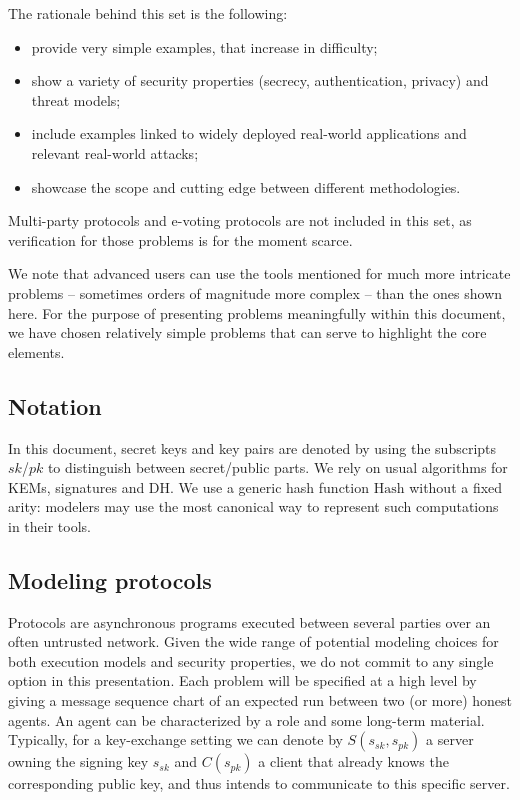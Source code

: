 \documentclass[11pt]{article}
\newcommand{\sfsk}{\mathit{sk}}
\newcommand{\sfpk}{\mathit{pk}}
\newcommand{\kwf}[1]{\mathrm{#1}}
\newcommand{\hash}{\kwf{Hash}}
\begin{document}
The rationale behind this set is the following:
\begin{itemize}
\item provide very simple examples, that increase in difficulty;
\item show a variety of security properties (secrecy, authentication, privacy) and threat models;
\item include examples linked to widely deployed real-world applications and relevant real-world attacks;
\item showcase the scope and cutting edge between different methodologies.
\end{itemize}

Multi-party protocols and e-voting protocols are not included in this set, as verification for those problems is for the moment scarce.

We note that advanced users can use the tools mentioned for much more intricate problems -- sometimes orders of magnitude more complex -- than the ones shown here. For the purpose of presenting problems meaningfully within this document, we have chosen relatively simple problems that can serve to highlight the core elements.

\subsection{Notation} 

In this document, secret keys and key pairs are denoted by using the subscripts $\sfsk$/$\sfpk$ to distinguish between secret/public parts. We rely on usual algorithms for KEMs, signatures and DH. We use a generic hash function $\hash$ without a fixed arity: modelers may use the most canonical way to represent such computations in their tools.


\subsection{Modeling protocols}

Protocols are asynchronous programs executed between several parties over an often untrusted network. Given the wide range of potential modeling choices for both execution models and security properties, we do not commit to any single option in this presentation. Each problem will be specified at a high level by giving a message sequence chart of an expected run between two (or more) honest agents. An agent can be characterized by a role and some long-term material. Typically, for a key-exchange setting we can denote by $S(s_\sfsk,s_\sfpk)$ a server owning the signing key $s_\sfsk$ and $C(s_\sfpk)$ a client that already knows the corresponding public key, and thus intends to communicate to this specific server.
\end{document}
